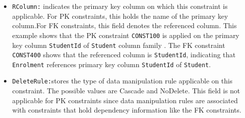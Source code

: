 \begin{itemize}
  \item \texttt{RColumn:}  indicates the primary key column on which this
  constraint is applicable.  For \ac{PK} constraints,  this holds the name of
  the primary key column.For \ac{FK} constraints, this field denotes
  the referenced column.  This example shows that the \ac{PK} constraint
  \texttt{CONST100} is applied on the primary key column \texttt{StudentId} of
  \texttt{Student} column family . The \ac{FK} constraint \texttt{CONST400}
  shows that the referenced column is \texttt{StudentId},  indicating that
  \texttt{Enrolment} references primary key column \texttt{StudentId} of \texttt{Student}.
  
  \item \texttt{DeleteRule:}stores the type of data manipulation rule applicable
  on this constraint. The possible values are  Cascade and NoDelete. This
  field is not applicable  for \ac{PK} constraints since data manipulation
  rules are associated with constraints that hold dependency information like
  the \ac{FK} constraints.
  
\end{itemize}


% 
% 

